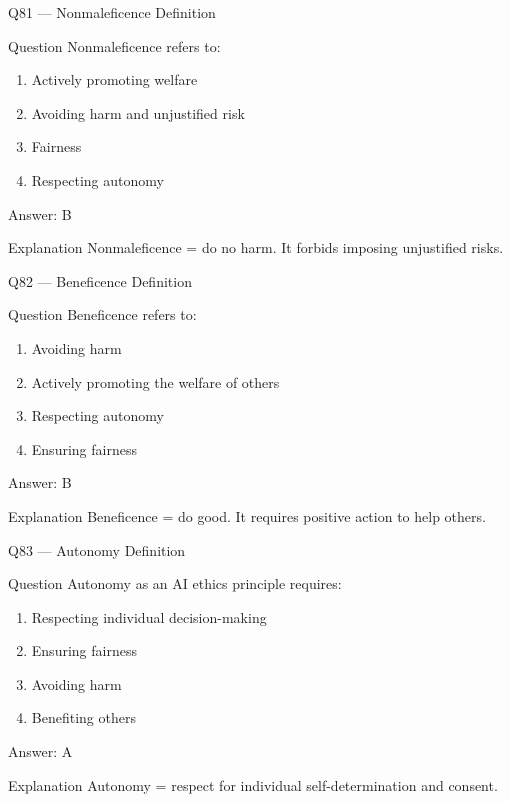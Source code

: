 \documentclass[aspectratio=169,8pt]{beamer}
\begin{document}
	\begin{frame}{Q81 --- Nonmaleficence Definition}
		\begin{block}{Question}
			Nonmaleficence refers to:
			\begin{enumerate}
				\item Actively promoting welfare
				\item Avoiding harm and unjustified risk
				\item Fairness
				\item Respecting autonomy
			\end{enumerate}
		\end{block}
		\begin{exampleblock}{Answer: B}\end{exampleblock}
		\begin{block}{Explanation}
			Nonmaleficence = do no harm. It forbids imposing unjustified risks.
		\end{block}
	\end{frame}
	
	\begin{frame}{Q82 --- Beneficence Definition}
		\begin{block}{Question}
			Beneficence refers to:
			\begin{enumerate}
				\item Avoiding harm
				\item Actively promoting the welfare of others
				\item Respecting autonomy
				\item Ensuring fairness
			\end{enumerate}
		\end{block}
		\begin{exampleblock}{Answer: B}\end{exampleblock}
		\begin{block}{Explanation}
			Beneficence = do good. It requires positive action to help others.
		\end{block}
	\end{frame}
	
	\begin{frame}{Q83 --- Autonomy Definition}
		\begin{block}{Question}
			Autonomy as an AI ethics principle requires:
			\begin{enumerate}
				\item Respecting individual decision-making
				\item Ensuring fairness
				\item Avoiding harm
				\item Benefiting others
			\end{enumerate}
		\end{block}
		\begin{exampleblock}{Answer: A}\end{exampleblock}
		\begin{block}{Explanation}
			Autonomy = respect for individual self-determination and consent.
		\end{block}
	\end{frame}
	
\end{document}
